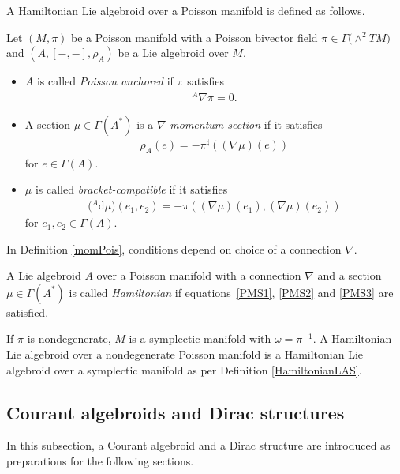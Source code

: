 \documentclass[pdftex]{sigma}
\numberwithin{equation}{section}
\newcommand{\rhoa}{{\rho_A}}
\newcommand{\rd}{\mathrm{d}}
\newcommand{\anabla}{{{}^A \nabla}}
\begin{document}
A Hamiltonian Lie algebroid over a Poisson manifold is defined as follows. \cite{Blohmann:2023}
\begin{Definition}\label{momPois}
Let $(M, \pi)$ be a Poisson manifold with a Poisson bivector field $\pi \in \Gamma\bigl(\wedge^2 TM\bigr)$
and $(A, [-,-], \rhoa)$ be a Lie algebroid over $M$.
\begin{itemize}\itemsep=0pt
\item[(P1)] $A$ is called \textit{Poisson anchored} if $\pi$ satisfies
\begin{gather}
\anabla \pi = 0.
\label{PMS1}
\end{gather}
\item[(P2)] A section $\mu \in \Gamma(A^*)$ is a $\nabla$-\textit{momentum section} if it satisfies
\begin{gather}
\rhoa(e) = - \pi^{\sharp} ((\nabla \mu)(e))\label{PMS2}
\end{gather}
for $e \in \Gamma(A)$.
\item[(P3)] $\mu$ is called \textit{bracket-compatible} if it satisfies
\begin{gather}
\bigl({}^A \rd \mu\bigr) (e_1, e_2) = - \pi((\nabla \mu)(e_1), (\nabla \mu)(e_2))\label{PMS3}
\end{gather}
for $e_1, e_2 \in \Gamma(A)$.
\end{itemize}
\end{Definition}
In Definition \ref{momPois}, conditions depend on choice of
a connection $\nabla$.

\begin{Definition}\label{HamiltonianLAP}
A Lie algebroid $A$ over a Poisson manifold with a connection $\nabla$ and a section~${\mu \in \Gamma(A^*)}$ is called \textit{Hamiltonian}
if equations~\eqref{PMS1}, \eqref{PMS2} and \eqref{PMS3}
are satisfied.
\end{Definition}
If $\pi$ is nondegenerate, $M$ is a symplectic manifold with
$\omega = \pi^{-1}$.
A Hamiltonian Lie algebroid over a nondegenerate Poisson manifold
is a Hamiltonian Lie algebroid over a symplectic manifold
as per Definition \ref{HamiltonianLAS}.

\subsection{Courant algebroids and Dirac structures}
In this subsection, a Courant algebroid and a Dirac structure \cite{Courant, LWX} are introduced
as preparations for the following sections.
\end{document}
